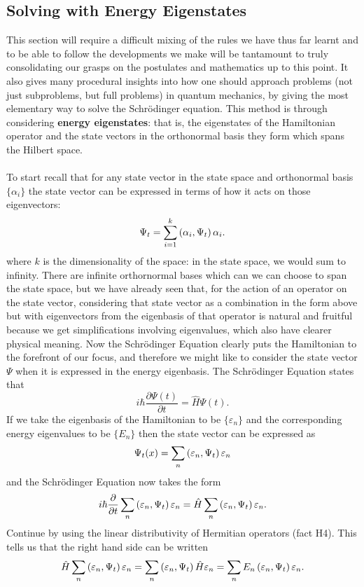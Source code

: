 \subsection{Solving with Energy Eigenstates}
This section will require a difficult mixing of the rules we have thus far learnt and to be able to follow the developments we make will be tantamount to truly consolidating our grasps on the postulates and mathematics up to this point. It also gives many procedural insights into how one should approach problems (not just subproblems, but full problems) in quantum mechanics, by giving the most elementary way to solve the Schr\"{o}dinger equation. This method is through considering \textbf{energy eigenstates}: that is, the eigenstates of the Hamiltonian operator and the state vectors in the orthonormal basis they form which spans the Hilbert space. 
\\\\
To start recall that for any state vector in the state space and orthonormal basis $\{\alpha_{i}\}$ the state vector can be expressed in terms of how it acts on those eigenvectors:
$$
\Psi_{t}=\sum_{i=1}^{k}\left(\alpha_{i},\Psi_{t}\right)\alpha_{i}.
$$
where $k$ is the dimensionality of the space: in the state space, we would sum to infinity. There are infinite orthornormal bases which can we can choose to span the state space, but we have already seen that, for the action of an operator on the state vector, considering that state vector as a combination in the form above but with eigenvectors from the eigenbasis of that operator is natural and fruitful because we get simplifications involving eigenvalues, which also have clearer physical meaning. Now the Schr\"{o}dinger Equation clearly puts the Hamiltonian to the forefront of our focus, and therefore we might like to consider the state vector $\Psi$ when it is expressed in the energy eigenbasis. The Schr\"{o}dinger Equation states that 
$$
i\hbar\frac{\partial \Psi(t)}{\partial t}=\hat{H}\Psi(t).
$$
If we take the eigenbasis of the Hamiltonian to be $\{\varepsilon_{n}\}$ and the corresponding energy eigenvalues to be $\{E_{n}\}$ then the state vector can be expressed as
$$
\Psi_{t}(x)=\sum_{n}\left(\varepsilon_{n},\Psi_{t}\right)\varepsilon_{n}
$$
and the Schr\"{o}dinger Equation now takes the form 
$$i\hbar\frac{\partial}{\partial t}\sum_{n}\left(\varepsilon_{n},\Psi_{t}\right)\varepsilon_{n}=\hat{H}\sum_{n}\left(\varepsilon_{n},\Psi_{t}\right)\varepsilon_{n}.
$$
Continue by using the linear distributivity of Hermitian operators (fact H4). This tells us that the right hand side can be written 
$$
\hat{H}\sum_{n}\left(\varepsilon_{n},\Psi_{t}\right)\varepsilon_{n}=\sum_{n}\left(\varepsilon_{n},\Psi_{t}\right)\hat{H}\varepsilon_{n}=\sum_{n}E_{n}\left(\varepsilon_{n},\Psi_{t}\right)\varepsilon_{n}.
$$
